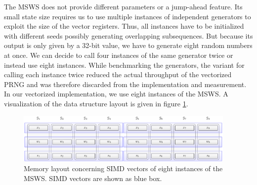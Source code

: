 \documentclass{stdlocal}
\begin{document}
    The MSWS does not provide different parameters or a jump-ahead feature.
    Its small state size requires us to use multiple instances of independent generators to exploit the size of the vector registers.
    Thus, all instances have to be initialized with different seeds possibly generating overlapping subsequences.
    But because its output is only given by a 32-bit value, we have to generate eight random numbers at once.
    We can decide to call four instances of the same generator twice or instead use eight instances.
    While benchmarking the generators, the variant for calling each instance twice reduced the actual throughput of the vectorized PRNG and was therefore discarded from the implementation and measurement.
    In our vectorized implementation, we use eight instances of the MSWS.
    A visualization of the data structure layout is given in figure \ref{fig:msws-vector-layout}.

    \begin{figure}
      \center
      \includegraphics[width=0.95\textwidth]{figures/msws_vector_layout.pdf}
      \caption[MSWS Vector Layout]{%
        Memory layout concerning SIMD vectors of eight instances of the MSWS.
        SIMD vectors are shown as blue box.
      }
      \label{fig:msws-vector-layout}
    \end{figure}
\end{document}
